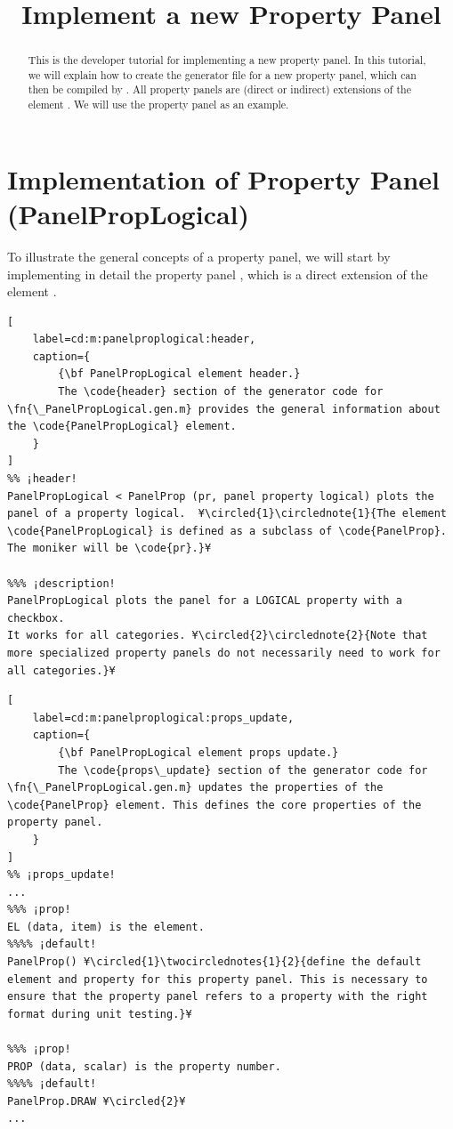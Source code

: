 \documentclass{tufte-handout}
\title{Implement a new Property Panel}
\begin{document}
\maketitle

\begin{abstract}
\noindent
This is the developer tutorial for implementing a new property panel. 
In this tutorial, we will explain how to create the generator file  for a new property panel, which can then be compiled by . 
All property panels are (direct or indirect) extensions of the element .
We will use the property panel  as an example.
\end{abstract}

\tableofcontents

\clearpage
\section{Implementation of Property Panel (PanelPropLogical)}


To illustrate the general concepts of a property panel, we will start by implementing in detail the property panel , which is a direct extension of the element .

\begin{lstlisting}[
	label=cd:m:panelproplogical:header,
	caption={
		{\bf PanelPropLogical element header.}
		The \code{header} section of the generator code for \fn{\_PanelPropLogical.gen.m} provides the general information about the \code{PanelPropLogical} element.
	}
]
%% ¡header!
PanelPropLogical < PanelProp (pr, panel property logical) plots the panel of a property logical.  ¥\circled{1}\circlednote{1}{The element \code{PanelPropLogical} is defined as a subclass of \code{PanelProp}. The moniker will be \code{pr}.}¥

%%% ¡description!
PanelPropLogical plots the panel for a LOGICAL property with a checkbox.
It works for all categories. ¥\circled{2}\circlednote{2}{Note that more specialized property panels do not necessarily need to work for all categories.}¥

\end{lstlisting}

\begin{lstlisting}[
	label=cd:m:panelproplogical:props_update,
	caption={
		{\bf PanelPropLogical element props update.}
		The \code{props\_update} section of the generator code for \fn{\_PanelPropLogical.gen.m} updates the properties of the \code{PanelProp} element. This defines the core properties of the property panel.
	}
]
%% ¡props_update!
...
%%% ¡prop!
EL (data, item) is the element.
%%%% ¡default!
PanelProp() ¥\circled{1}\twocirclednotes{1}{2}{define the default element and property for this property panel. This is necessary to ensure that the property panel refers to a property with the right format during unit testing.}¥

%%% ¡prop!
PROP (data, scalar) is the property number.
%%%% ¡default!
PanelProp.DRAW ¥\circled{2}¥
...
\end{lstlisting}
\end{document}
